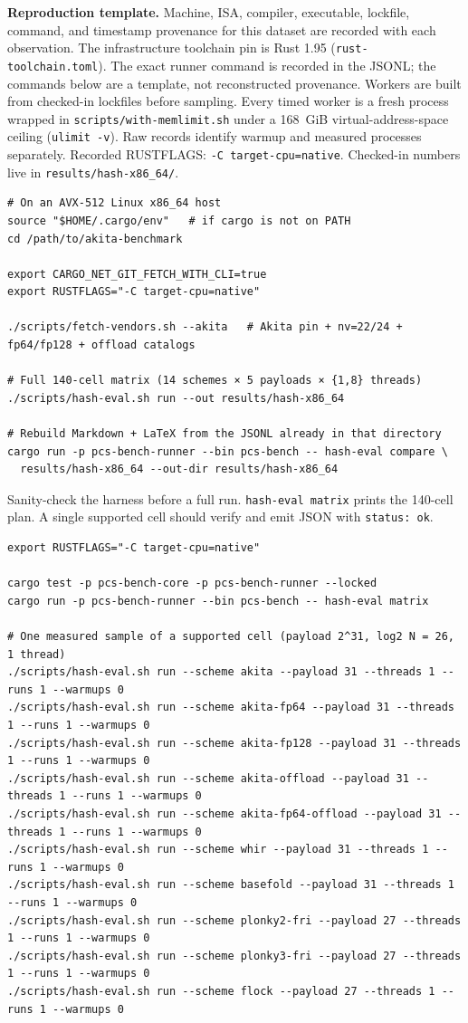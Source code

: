 \medskip
\noindent\textbf{Reproduction template.}
Machine, ISA, compiler, executable, lockfile, command, and timestamp provenance
for this dataset are recorded with each observation. The infrastructure
toolchain pin is Rust 1.95 (\texttt{rust-toolchain.toml}).
The exact runner command is recorded in the JSONL; the commands below are a
template, not reconstructed provenance.
Workers are built from checked-in lockfiles before sampling. Every timed worker
is a fresh process wrapped in \texttt{scripts/with-memlimit.sh} under a
168~GiB virtual-address-space ceiling (\texttt{ulimit -v}).
Raw records
identify warmup and measured processes separately. Recorded RUSTFLAGS:
\texttt{{-C target-cpu=native}}. Checked-in numbers live in
\texttt{results/hash-x86\_64/}.
\begin{verbatim}
# On an AVX-512 Linux x86_64 host
source "$HOME/.cargo/env"   # if cargo is not on PATH
cd /path/to/akita-benchmark

export CARGO_NET_GIT_FETCH_WITH_CLI=true
export RUSTFLAGS="-C target-cpu=native"

./scripts/fetch-vendors.sh --akita   # Akita pin + nv=22/24 + fp64/fp128 + offload catalogs

# Full 140-cell matrix (14 schemes × 5 payloads × {1,8} threads)
./scripts/hash-eval.sh run --out results/hash-x86_64

# Rebuild Markdown + LaTeX from the JSONL already in that directory
cargo run -p pcs-bench-runner --bin pcs-bench -- hash-eval compare \
  results/hash-x86_64 --out-dir results/hash-x86_64
\end{verbatim}
\noindent Sanity-check the harness before a full run.
\texttt{hash-eval matrix} prints the 140-cell plan.
A single supported cell should verify and emit JSON with \texttt{status: ok}.
\begin{verbatim}
export RUSTFLAGS="-C target-cpu=native"

cargo test -p pcs-bench-core -p pcs-bench-runner --locked
cargo run -p pcs-bench-runner --bin pcs-bench -- hash-eval matrix

# One measured sample of a supported cell (payload 2^31, log2 N = 26, 1 thread)
./scripts/hash-eval.sh run --scheme akita --payload 31 --threads 1 --runs 1 --warmups 0
./scripts/hash-eval.sh run --scheme akita-fp64 --payload 31 --threads 1 --runs 1 --warmups 0
./scripts/hash-eval.sh run --scheme akita-fp128 --payload 31 --threads 1 --runs 1 --warmups 0
./scripts/hash-eval.sh run --scheme akita-offload --payload 31 --threads 1 --runs 1 --warmups 0
./scripts/hash-eval.sh run --scheme akita-fp64-offload --payload 31 --threads 1 --runs 1 --warmups 0
./scripts/hash-eval.sh run --scheme whir --payload 31 --threads 1 --runs 1 --warmups 0
./scripts/hash-eval.sh run --scheme basefold --payload 31 --threads 1 --runs 1 --warmups 0
./scripts/hash-eval.sh run --scheme plonky2-fri --payload 27 --threads 1 --runs 1 --warmups 0
./scripts/hash-eval.sh run --scheme plonky3-fri --payload 27 --threads 1 --runs 1 --warmups 0
./scripts/hash-eval.sh run --scheme flock --payload 27 --threads 1 --runs 1 --warmups 0
\end{verbatim}

